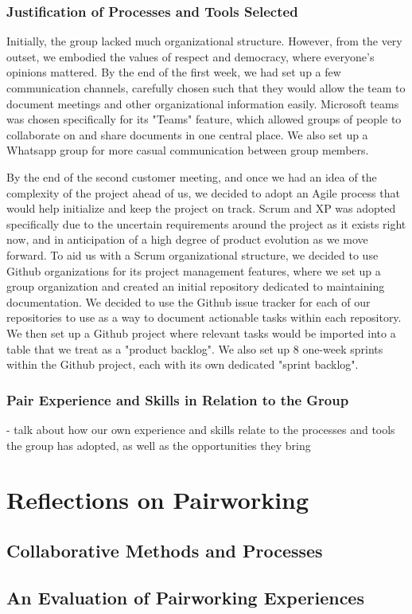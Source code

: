 \documentclass[11pt]{article}
\begin{document}
        \subsubsection{Justification of Processes and Tools Selected}
        Initially, the group lacked much organizational structure. However, from the very outset, we embodied the values of respect and democracy, where everyone's opinions mattered. By the end of the first week, we had set up a few communication channels, carefully chosen such that they would allow the team to document meetings and other organizational information easily. Microsoft teams was chosen specifically for its "Teams" feature, which allowed groups of people to collaborate on and share documents in one central place. We also set up a Whatsapp group for more casual communication between group members.

        By the end of the second customer meeting, and once we had an idea of the complexity of the project ahead of us, we decided to adopt an Agile process that would help initialize and keep the project on track. Scrum and XP was adopted specifically due to the uncertain requirements around the project as it exists right now, and in anticipation of a high degree of product evolution as we move forward. To aid us with a Scrum organizational structure, we decided to use Github organizations for its project management features, where we set up a group organization and created an initial repository dedicated to maintaining documentation. We decided to use the Github issue tracker for each of our repositories to use as a way to document actionable tasks within each repository. We then set up a Github project where relevant tasks would be imported into a table that we treat as a "product backlog". We also set up 8 one-week sprints within the Github project, each with its own dedicated "sprint backlog". 
        
        \subsubsection{Pair Experience and Skills in Relation to the Group}
        - talk about how our own experience and skills relate to the processes and tools the group has adopted, as well as the opportunities they bring

\section{Reflections on Pairworking}
    \subsection{Collaborative Methods and Processes}
    \subsection{An Evaluation of Pairworking Experiences}



\newpage

\end{document}
